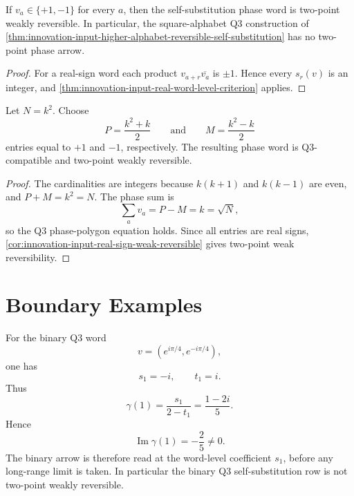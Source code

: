\begin{corollary}
\label{cor:innovation-input-real-sign-weak-reversible}
If $v_a\in\{+1,-1\}$ for every $a$, then the self-substitution phase word
is two-point weakly reversible. In particular, the square-alphabet Q3
construction of
\autoref{thm:innovation-input-higher-alphabet-reversible-self-substitution}
has no two-point phase arrow.
\end{corollary}

\begin{proof}
For a real-sign word each product $v_{a+r}\overline{v_a}$ is $\pm1$.
Hence every $s_r(v)$ is an integer, and
\autoref{thm:innovation-input-real-word-level-criterion} applies.
\end{proof}

\begin{theorem}
\label{thm:innovation-input-square-alphabet-real-sign-correlation-boundary}
Let $N=k^2$. Choose
$$
P=\frac{k^2+k}{2}
\qquad
\text{and}
\qquad
M=\frac{k^2-k}{2}
$$
entries equal to $+1$ and $-1$, respectively. The resulting phase word is
Q3-compatible and two-point weakly reversible.
\end{theorem}

\begin{proof}
The cardinalities are integers because $k(k+1)$ and $k(k-1)$ are even,
and $P+M=k^2=N$. The phase sum is
$$
\sum_a v_a=P-M=k=\sqrt N,
$$
so the Q3 phase-polygon equation holds. Since all entries are real signs,
\autoref{cor:innovation-input-real-sign-weak-reversible} gives two-point
weak reversibility.
\end{proof}

\section{Boundary Examples}
\label{sec:innovation-input-correlation-boundary-examples}

\begin{principle}
\label{prin:innovation-input-binary-coefficient-source-arrow}
For the binary Q3 word
$$
v=(e^{i\pi/4},e^{-i\pi/4}),
$$
one has
$$
s_1=-i,
\qquad
t_1=i.
$$
Thus
$$
\gamma(1)=\frac{s_1}{2-t_1}=\frac{1-2i}{5}.
$$
Hence
$$
\operatorname{Im}\gamma(1)=-\frac25\ne0.
$$
The binary arrow is therefore read at the word-level coefficient
$s_1$, before any long-range limit is taken. In particular the binary Q3
self-substitution row is not two-point weakly reversible.
\end{principle}

